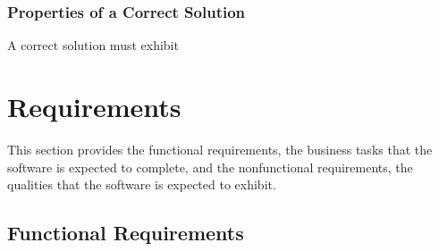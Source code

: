\documentclass[12pt]{article}
\begin{document}
\subsubsection{Properties of a Correct Solution} \label{sec_CorrectSolution}

\noindent
A correct solution must exhibit 

\section{Requirements}

This section provides the functional requirements, the business tasks that the
software is expected to complete, and the nonfunctional requirements, the
qualities that the software is expected to exhibit.

\subsection{Functional Requirements}
\end{document}
